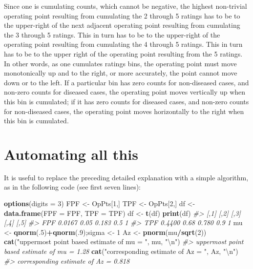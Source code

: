 \documentclass[
]{book}
\newenvironment{Shaded}{\begin{snugshade}}{\end{snugshade}}
\newcommand{\CharTok}[1]{\textcolor[rgb]{0.31,0.60,0.02}{#1}}
\newcommand{\CommentTok}[1]{\textcolor[rgb]{0.56,0.35,0.01}{\textit{#1}}}
\newcommand{\DataTypeTok}[1]{\textcolor[rgb]{0.13,0.29,0.53}{#1}}
\newcommand{\DecValTok}[1]{\textcolor[rgb]{0.00,0.00,0.81}{#1}}
\newcommand{\KeywordTok}[1]{\textcolor[rgb]{0.13,0.29,0.53}{\textbf{#1}}}
\newcommand{\NormalTok}[1]{#1}
\newcommand{\OperatorTok}[1]{\textcolor[rgb]{0.81,0.36,0.00}{\textbf{#1}}}
\newcommand{\StringTok}[1]{\textcolor[rgb]{0.31,0.60,0.02}{#1}}
\begin{document}
Since one is cumulating counts, which cannot be negative, the highest non-trivial operating point resulting from cumulating the 2 through 5 ratings has to be to the upper-right of the next adjacent operating point resulting from cumulating the 3 through 5 ratings. This in turn has to be to the upper-right of the operating point resulting from cumulating the 4 through 5 ratings. This in turn has to be to the upper right of the operating point resulting from the 5 ratings. In other words, as one cumulates ratings bins, the operating point must move monotonically up and to the right, or more accurately, the point cannot move down or to the left. If a particular bin has zero counts for non-diseased cases, and non-zero counts for diseased cases, the operating point moves vertically up when this bin is cumulated; if it has zero counts for diseased cases, and non-zero counts for non-diseased cases, the operating point moves horizontally to the right when this bin is cumulated.

\hypertarget{automating-all-this}{%
\section{Automating all this}\label{automating-all-this}}

It is useful to replace the preceding detailed explanation with a simple algorithm, as in the following code (see first seven lines):

\begin{Shaded}
\begin{Highlighting}[]
\KeywordTok{options}\NormalTok{(}\DataTypeTok{digits =} \DecValTok{3}\NormalTok{)}
\NormalTok{FPF \textless{}{-}}\StringTok{ }\NormalTok{OpPts[}\DecValTok{1}\NormalTok{,]}
\NormalTok{TPF \textless{}{-}}\StringTok{ }\NormalTok{OpPts[}\DecValTok{2}\NormalTok{,]}
\NormalTok{df \textless{}{-}}\StringTok{ }\KeywordTok{data.frame}\NormalTok{(}\DataTypeTok{FPF =}\NormalTok{ FPF, }\DataTypeTok{TPF =}\NormalTok{ TPF)}
\NormalTok{df \textless{}{-}}\StringTok{ }\KeywordTok{t}\NormalTok{(df)}
\KeywordTok{print}\NormalTok{(df)}
\CommentTok{\#\textgreater{}       [,1] [,2]  [,3] [,4] [,5]}
\CommentTok{\#\textgreater{} FPF 0.0167 0.05 0.183  0.5    1}
\CommentTok{\#\textgreater{} TPF 0.4400 0.68 0.780  0.9    1}
\NormalTok{mu \textless{}{-}}\StringTok{ }\KeywordTok{qnorm}\NormalTok{(.}\DecValTok{5}\NormalTok{)}\OperatorTok{+}\KeywordTok{qnorm}\NormalTok{(.}\DecValTok{9}\NormalTok{);sigma \textless{}{-}}\StringTok{ }\DecValTok{1}
\NormalTok{Az \textless{}{-}}\StringTok{ }\KeywordTok{pnorm}\NormalTok{(mu}\OperatorTok{/}\KeywordTok{sqrt}\NormalTok{(}\DecValTok{2}\NormalTok{))}
\KeywordTok{cat}\NormalTok{(}\StringTok{"uppermost point based estimate of mu = "}\NormalTok{, mu, }\StringTok{"}\CharTok{\textbackslash{}n}\StringTok{"}\NormalTok{)}
\CommentTok{\#\textgreater{} uppermost point based estimate of mu =  1.28}
\KeywordTok{cat}\NormalTok{(}\StringTok{"corresponding estimate of Az = "}\NormalTok{, Az, }\StringTok{"}\CharTok{\textbackslash{}n}\StringTok{"}\NormalTok{)}
\CommentTok{\#\textgreater{} corresponding estimate of Az =  0.818}
\end{Highlighting}
\end{Shaded}
\end{document}
